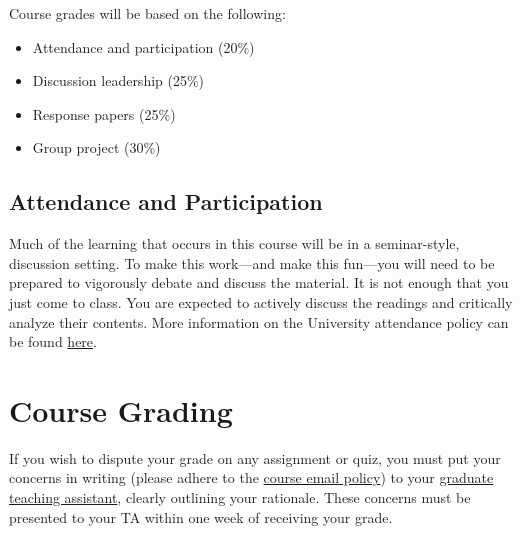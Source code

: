 \documentclass[
  letterpaper,
]{article}
\providecommand{\tightlist}{%
  \setlength{\itemsep}{0pt}\setlength{\parskip}{0pt}}\usepackage{longtable,booktabs,array}
\begin{document}
Course grades will be based on the following:

\begin{itemize}
\tightlist
\item
  Attendance and participation (20\%)
\item
  Discussion leadership (25\%)
\item
  Response papers (25\%)
\item
  Group project (30\%)
\end{itemize}

\subsection{Attendance and
Participation}\label{attendance-and-participation}

Much of the learning that occurs in this course will be in a
seminar-style, discussion setting. To make this work---and make this
fun---you will need to be prepared to vigorously debate and discuss the
material. It is not enough that you just come to class. You are expected
to actively discuss the readings and critically analyze their contents.
More information on the University attendance policy can be found
\href{https://catalog.utah.edu/pages/8Fjihzb4XouQv5OY0ZiE}{here}.

\section{Course Grading}\label{course-grading}

\begin{tcolorbox}[enhanced jigsaw, left=2mm, toptitle=1mm, opacitybacktitle=0.6, leftrule=.75mm, title=\textcolor{quarto-callout-important-color}{\faExclamation}\hspace{0.5em}{Important}, colback=white, colframe=quarto-callout-important-color-frame, toprule=.15mm, rightrule=.15mm, coltitle=black, arc=.35mm, bottomtitle=1mm, colbacktitle=quarto-callout-important-color!10!white, breakable, bottomrule=.15mm, titlerule=0mm, opacityback=0]

If you wish to dispute your grade on any assignment or quiz, you must
put your concerns in writing (please adhere to the
\hyperref[sec-policies]{course email policy}) to your
\hyperref[sec-ta]{graduate teaching assistant}, clearly outlining your
rationale. These concerns must be presented to your TA within one week
of receiving your grade.

\end{tcolorbox}
\end{document}
